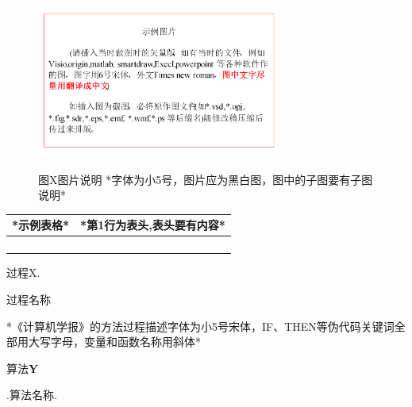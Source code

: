 \documentclass[10.5pt,compsoc]{CjC}
\theoremstyle{mystyle}
\begin{document}
\begin{CJK*}{UTF8}{zhhei}

\begin{figure}[htbp]
\centerline{\includegraphics[width=3.15in,height=1.98in]{CJC1.pdf}}
图X\quad  图片说明 *字体为小5号，图片应为黑白图，图中的子图要有子图说明*
\label{fig1}
\end{figure}

\begin{table}[htbp]
\vspace {-2.5mm}
\begin{center}
\begin{tabular}{ll}
\toprule
*示例表格*&*第1行为表头,表头要有内容* \\
\hline
&
 \\
&
 \\
&
 \\
&
 \\
\bottomrule
\end{tabular}
\label{tab1}
\end{center}
\end{table}

\begin{CJK*}{UTF8}{zhhei}过程X.\end{CJK*}\quad 过程名称

{*《计算机学报》的方法过程描述字体为小5号宋体，IF、THEN等伪代码关键词全部用大写字母，变量和函数名称用斜体*}


\begin{CJK*}{UTF8}{zhhei}算法\textbf{Y}\end{CJK*}.\quad 算法名称.

\vspace {3mm}



\end{CJK*}
\end{document}
